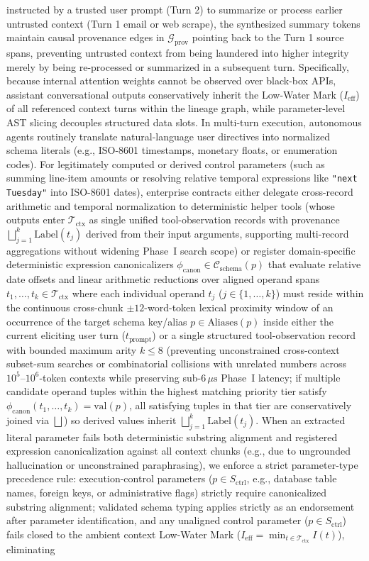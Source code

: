 \documentclass[conference,10pt]{IEEEtran}
\begin{document}
instructed by a trusted user prompt (Turn 2) to summarize or process earlier untrusted context (Turn 1 email or web scrape), the synthesized summary tokens maintain causal provenance edges in $\mathcal{G}_{\text{prov}}$ pointing back to the Turn 1 source spans, preventing untrusted context from being laundered into higher integrity merely by being re-processed or summarized in a subsequent turn. Specifically, because internal attention weights cannot be observed over black-box APIs, assistant conversational outputs conservatively inherit the Low-Water Mark ($I_{\text{eff}}$) of all referenced context turns within the lineage graph, while parameter-level AST slicing decouples structured data slots. In multi-turn execution, autonomous agents routinely translate natural-language user directives into normalized schema literals (e.g., ISO-8601 timestamps, monetary floats, or enumeration codes). For legitimately computed or derived control parameters (such as summing line-item amounts or resolving relative temporal expressions like \texttt{"next Tuesday"} into ISO-8601 dates), enterprise contracts either delegate cross-record arithmetic and temporal normalization to deterministic helper tools (whose outputs enter $\mathcal{T}_{\text{ctx}}$ as single unified tool-observation records with provenance $\bigsqcup_{j=1}^k \text{Label}(t_j)$ derived from their input arguments, supporting multi-record aggregations without widening Phase~I search scope) or register domain-specific deterministic expression canonicalizers $\phi_{\text{canon}} \in \mathcal{C}_{\text{schema}}(p)$ that evaluate relative date offsets and linear arithmetic reductions over aligned operand spans $t_1, \dots, t_k \in \mathcal{T}_{\text{ctx}}$ where each individual operand $t_j$ ($j \in \{1, \dots, k\}$) must reside within the continuous cross-chunk $\pm 12$-word-token lexical proximity window of an occurrence of the target schema key/alias $p \in \text{Aliases}(p)$ inside either the current eliciting user turn ($t_{\text{prompt}}$) or a single structured tool-observation record with bounded maximum arity $k \le 8$ (preventing unconstrained cross-context subset-sum searches or combinatorial collisions with unrelated numbers across $10^5\text{--}10^6$-token contexts while preserving sub-$6\,\mu\text{s}$ Phase~I latency; if multiple candidate operand tuples within the highest matching priority tier satisfy $\phi_{\text{canon}}(t_1, \dots, t_k) = \text{val}(p)$, all satisfying tuples in that tier are conservatively joined via $\bigsqcup$) so derived values inherit $\bigsqcup_{j=1}^k \text{Label}(t_j)$. When an extracted literal parameter fails both deterministic substring alignment and registered expression canonicalization against all context chunks (e.g., due to ungrounded hallucination or unconstrained paraphrasing), we enforce a strict parameter-type precedence rule: execution-control parameters ($p \in S_{\text{ctrl}}$, e.g., database table names, foreign keys, or administrative flags) strictly require canonicalized substring alignment; validated schema typing applies strictly as an endorsement after parameter identification, and any unaligned control parameter ($p \in S_{\text{ctrl}}$) fails closed to the ambient context Low-Water Mark ($I_{\text{eff}} = \min_{t \in \mathcal{T}_{\text{ctx}}} I(t)$), eliminating 
\end{document}
